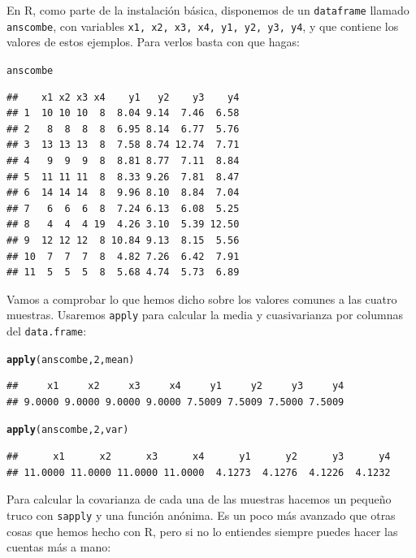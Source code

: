 \documentclass[10pt,a4paper]{article}\usepackage[]{graphicx}\usepackage[]{color}
\makeatletter
\newcommand{\hlnum}[1]{\textcolor[rgb]{0.686,0.059,0.569}{#1}}%
\newcommand{\hlstd}[1]{\textcolor[rgb]{0.345,0.345,0.345}{#1}}%
\newcommand{\hlkwd}[1]{\textcolor[rgb]{0.737,0.353,0.396}{\textbf{#1}}}%
\newenvironment{kframe}{%
 \def\at@end@of@kframe{}%
 \ifinner\ifhmode%
  \def\at@end@of@kframe{\end{minipage}}%
  \begin{minipage}{\columnwidth}%
 \fi\fi%
 \def\FrameCommand##1{\hskip\@totalleftmargin \hskip-\fboxsep
 \colorbox{shadecolor}{##1}\hskip-\fboxsep
     \hskip-\linewidth \hskip-\@totalleftmargin \hskip\columnwidth}%
 \MakeFramed {\advance\hsize-\width
   \@totalleftmargin\z@ \linewidth\hsize
   \@setminipage}}%
 {\par\unskip\endMakeFramed%
 \at@end@of@kframe}
\newenvironment{knitrout}{}{} %
\newcounter {cont01}
\makeatother
\begin{document}
En R, como parte de la instalación básica, disponemos de un {\tt dataframe} llamado {\tt anscombe}, con variables {\tt x1, x2, x3, x4, y1, y2, y3, y4}, y que contiene los valores de estos ejemplos. Para verlos basta con que hagas:
\begin{knitrout}
\color{fgcolor}\begin{kframe}
\begin{alltt}
\hlstd{anscombe}
\end{alltt}
\begin{verbatim}
##    x1 x2 x3 x4    y1   y2    y3    y4
## 1  10 10 10  8  8.04 9.14  7.46  6.58
## 2   8  8  8  8  6.95 8.14  6.77  5.76
## 3  13 13 13  8  7.58 8.74 12.74  7.71
## 4   9  9  9  8  8.81 8.77  7.11  8.84
## 5  11 11 11  8  8.33 9.26  7.81  8.47
## 6  14 14 14  8  9.96 8.10  8.84  7.04
## 7   6  6  6  8  7.24 6.13  6.08  5.25
## 8   4  4  4 19  4.26 3.10  5.39 12.50
## 9  12 12 12  8 10.84 9.13  8.15  5.56
## 10  7  7  7  8  4.82 7.26  6.42  7.91
## 11  5  5  5  8  5.68 4.74  5.73  6.89
\end{verbatim}
\end{kframe}
\end{knitrout}
Vamos a comprobar lo que hemos dicho sobre los valores comunes a las cuatro muestras. Usaremos {\tt apply} para calcular la media y cuasivarianza por columnas del {\tt data.frame}:
\begin{knitrout}
\color{fgcolor}\begin{kframe}
\begin{alltt}
\hlkwd{apply}\hlstd{(anscombe,} \hlnum{2}\hlstd{, mean)}
\end{alltt}
\begin{verbatim}
##     x1     x2     x3     x4     y1     y2     y3     y4 
## 9.0000 9.0000 9.0000 9.0000 7.5009 7.5009 7.5000 7.5009
\end{verbatim}
\begin{alltt}
\hlkwd{apply}\hlstd{(anscombe,} \hlnum{2}\hlstd{, var)}
\end{alltt}
\begin{verbatim}
##      x1      x2      x3      x4      y1      y2      y3      y4 
## 11.0000 11.0000 11.0000 11.0000  4.1273  4.1276  4.1226  4.1232
\end{verbatim}
\end{kframe}
\end{knitrout}
Para calcular la covarianza de cada una de las muestras hacemos un pequeño truco con {\tt sapply} y una función anónima. Es un poco más avanzado que otras cosas que hemos hecho con R, pero si no lo entiendes siempre puedes hacer las cuentas más a mano:
\end{document}
